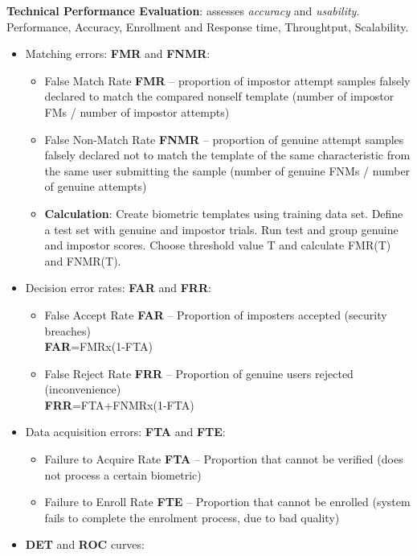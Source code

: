 \documentclass[a4paper]{article}
\begin{document}
      \textbf{Technical Performance Evaluation}: assesses \emph{accuracy} and \emph{usability}. Performance, Accuracy, Enrollment and Response time, Throughtput, Scalability.
      \begin{itemize}
        \item Matching errors: \textbf{FMR} and \textbf{FNMR}:
        \begin{itemize}
          \item False Match Rate \textbf{FMR} -- proportion of impostor attempt samples falsely declared to match the compared nonself template (number of impostor FMs / number of impostor attempts)
          \item False Non-Match Rate \textbf{FNMR} -- proportion of genuine attempt samples falsely declared not to match the template of the same characteristic from the same user submitting the sample (number of genuine FNMs / number of genuine attempts)
          \item \textbf{Calculation}: Create biometric templates using training data set. Define a test set with genuine and impostor trials. Run test and group genuine and impostor scores. Choose threshold value T and calculate FMR(T) and FNMR(T).
        \end{itemize}
        \item Decision error rates: \textbf{FAR} and \textbf{FRR}:
        \begin{itemize}
          \item False Accept Rate \textbf{FAR} -- Proportion of imposters accepted (security breaches)\\\textbf{FAR}=FMRx(1-FTA)
          \item False Reject Rate \textbf{FRR} -- Proportion of genuine users rejected (inconvenience)\\\textbf{FRR}=FTA+FNMRx(1-FTA)
        \end{itemize}
        \item Data acquisition errors: \textbf{FTA} and \textbf{FTE}:
        \begin{itemize}
          \item Failure to Acquire Rate \textbf{FTA} -- Proportion that cannot be verified (does not process a certain biometric)
          \item Failure to Enroll Rate \textbf{FTE} -- Proportion that cannot be enrolled (system fails to complete the enrolment process, due to bad quality)
        \end{itemize}
        \item \textbf{DET} and \textbf{ROC} curves:

\end{itemize}
\end{document}
